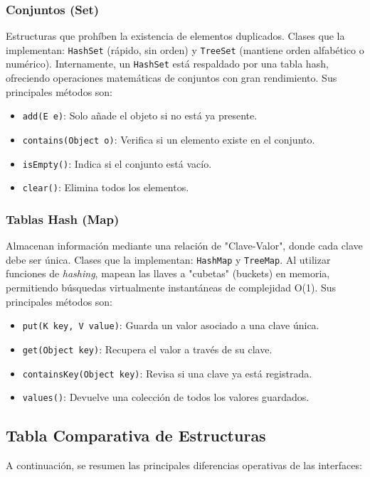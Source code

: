 \documentclass[12pt, letterpaper]{article}
\begin{document}
	\subsubsection{Conjuntos (Set)}
	Estructuras que prohíben la existencia de elementos duplicados. Clases que la implementan: \texttt{HashSet} (rápido, sin orden) y \texttt{TreeSet} (mantiene orden alfabético o numérico). 
	Internamente, un \texttt{HashSet} está respaldado por una tabla hash, ofreciendo operaciones matemáticas de conjuntos con gran rendimiento. Sus principales métodos son:
	\begin{itemize}
		\item \texttt{add(E e)}: Solo añade el objeto si no está ya presente.
		\item \texttt{contains(Object o)}: Verifica si un elemento existe en el conjunto.
		\item \texttt{isEmpty()}: Indica si el conjunto está vacío.
		\item \texttt{clear()}: Elimina todos los elementos.
	\end{itemize}
	
	\subsubsection{Tablas Hash (Map)}
	Almacenan información mediante una relación de "Clave-Valor", donde cada clave debe ser única. Clases que la implementan: \texttt{HashMap} y \texttt{TreeMap}.
	Al utilizar funciones de \textit{hashing}, mapean las llaves a "cubetas" (buckets) en memoria, permitiendo búsquedas virtualmente instantáneas de complejidad O(1). Sus principales métodos son:
	\begin{itemize}
		\item \texttt{put(K key, V value)}: Guarda un valor asociado a una clave única.
		\item \texttt{get(Object key)}: Recupera el valor a través de su clave.
		\item \texttt{containsKey(Object key)}: Revisa si una clave ya está registrada.
		\item \texttt{values()}: Devuelve una colección de todos los valores guardados.
	\end{itemize}
	
	\subsection{Tabla Comparativa de Estructuras}
	A continuación, se resumen las principales diferencias operativas de las interfaces:
	
\end{document}
